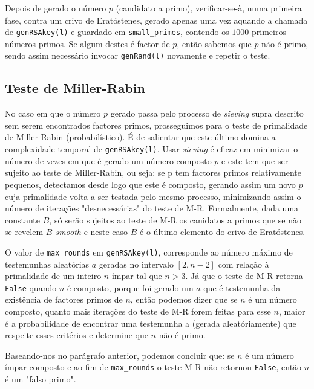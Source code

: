 \documentclass[dvipsnames]{article}
\begin{document}
\begin{multicols}{2}
  Depois de gerado o número $p$ (candidato a primo), verificar-se-à, numa primeira fase, contra um crivo de Eratóstenes, gerado apenas uma vez aquando a chamada de \texttt{genRSAkey(l)} e guardado em \texttt{small\_primes}, contendo os $1000$ primeiros números primos. Se algum destes é factor de $p$, então sabemos que $p$ não é primo, sendo assim necessário invocar \texttt{genRand(l)} novamente e repetir o teste.
  
  \subsection{Teste de Miller-Rabin}
  
  No caso em que o número $p$ gerado passa pelo processo de \textit{sieving} supra descrito sem serem encontrados factores primos, prosseguimos para o teste de primalidade de Miller-Rabin (probabilístico). É de salientar que este último domina a complexidade temporal de \texttt{genRSAkey(l)}. Usar \textit{sieving} é eficaz em minimizar o número de vezes em que é gerado um número composto $p$ e este tem que ser sujeito ao teste de Miller-Rabin, ou seja: se p tem factores primos relativamente pequenos, detectamos desde logo que este é composto, gerando assim um novo $p$ cuja primalidade volta a ser testada pelo mesmo processo, minimizando assim o número de iterações "desnecessárias" do teste de M-R. Formalmente, dada uma constante $B$, só serão sujeitos ao teste de M-R os canidatos a primos que se não se revelem $B$\textit{-smooth} \cite{DBLP:journals/dcc/Lenstra00} e neste caso $B$ é o último elemento do crivo de Eratóstenes.
  
  \vskip 0.4cm
  
  \noindent O valor de \texttt{max\_rounds} em \texttt{genRSAkey(l)}, corresponde ao número máximo de testemunhas aleatórias $a$ geradas no intervalo $[2,n-2]$ com relação à primalidade de um inteiro $n$ ímpar tal que $n>3$. Já que o teste de M-R retorna \texttt{False} quando $n$ é composto, porque foi gerado um $a$ que é testemunha da existência de factores primos de $n$, então podemos dizer que se $n$ é um número composto, quanto mais iterações do teste de M-R forem feitas para esse $n$, maior é a probabilidade de encontrar uma testemunha a (gerada aleatóriamente) que respeite esses critérios e determine que $n$ não é primo.
  
  \vskip 0.4cm
  
  \noindent Baseando-nos no parágrafo anterior, podemos concluir que: se $n$ é um número ímpar composto e ao fim de \texttt{max\_rounds} o teste M-R não retornou \texttt{False}, então $n$ é um "falso primo".\\
  

\end{multicols}
\end{document}
